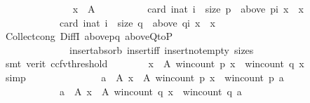 \begin{isabellebody}
\ \ \ \ \ \ \isamarkupfalse%
\isanewline
\ \ \ \ \ \ \ \ {\isachardoublequoteopen}{\isasymforall}x\ {\isasymin}\ A{\isachardot}{\kern0pt}\isanewline
\ \ \ \ \ \ \ \ \ \ card\ {\isacharbraceleft}{\kern0pt}i{\isacharcolon}{\kern0pt}{\isacharcolon}{\kern0pt}nat{\isachardot}{\kern0pt}\ i\ {\isacharless}{\kern0pt}\ size\ p\ {\isasymand}\ above\ {\isacharparenleft}{\kern0pt}p{\isacharbang}{\kern0pt}i{\isacharparenright}{\kern0pt}\ x\ {\isacharequal}{\kern0pt}\ {\isacharbraceleft}{\kern0pt}x{\isacharbraceright}{\kern0pt}{\isacharbraceright}{\kern0pt}\ {\isacharequal}{\kern0pt}\isanewline
\ \ \ \ \ \ \ \ \ \ \ \ card\ {\isacharbraceleft}{\kern0pt}i{\isacharcolon}{\kern0pt}{\isacharcolon}{\kern0pt}nat{\isachardot}{\kern0pt}\ i\ {\isacharless}{\kern0pt}\ size\ q\ {\isasymand}\ above\ {\isacharparenleft}{\kern0pt}q{\isacharbang}{\kern0pt}i{\isacharparenright}{\kern0pt}\ x\ {\isacharequal}{\kern0pt}\ {\isacharbraceleft}{\kern0pt}x{\isacharbraceright}{\kern0pt}{\isacharbraceright}{\kern0pt}{\isachardoublequoteclose}\isanewline
\ \ \ \ \ \ \ \ \isamarkupfalse%
\ Collect{\isacharunderscore}{\kern0pt}cong\ DiffI\ above{\isacharunderscore}{\kern0pt}pq\ above{\isacharunderscore}{\kern0pt}QtoP\isanewline
\ \ \ \ \ \ \ \ \ \ \ \ \ \ insert{\isacharunderscore}{\kern0pt}absorb\ insert{\isacharunderscore}{\kern0pt}iff\ insert{\isacharunderscore}{\kern0pt}not{\isacharunderscore}{\kern0pt}empty\ sizes\isanewline
\ \ \ \ \ \ \ \ \isamarkupfalse%
\ {\isacharparenleft}{\kern0pt}smt\ {\isacharparenleft}{\kern0pt}verit{\isacharcomma}{\kern0pt}\ ccfv{\isacharunderscore}{\kern0pt}threshold{\isacharparenright}{\kern0pt}{\isacharparenright}{\kern0pt}\isanewline
\ \ \ \ \ \ \isamarkupfalse%
\ {\isachardoublequoteopen}{\isasymforall}x\ {\isasymin}\ A{\isachardot}{\kern0pt}\ win{\isacharunderscore}{\kern0pt}count\ p\ x\ {\isacharequal}{\kern0pt}\ win{\isacharunderscore}{\kern0pt}count\ q\ x{\isachardoublequoteclose}\isanewline
\ \ \ \ \ \ \ \ \isamarkupfalse%
\ simp\isanewline
\ \ \ \ \ \ \isamarkupfalse%
\isanewline
\ \ \ \ \ \ \ \ {\isachardoublequoteopen}{\isacharbraceleft}{\kern0pt}a\ {\isasymin}\ A{\isachardot}{\kern0pt}\ {\isasymforall}x\ {\isasymin}\ A{\isachardot}{\kern0pt}\ win{\isacharunderscore}{\kern0pt}count\ p\ x\ {\isasymle}\ win{\isacharunderscore}{\kern0pt}count\ p\ a{\isacharbraceright}{\kern0pt}\ {\isacharequal}{\kern0pt}\isanewline
\ \ \ \ \ \ \ \ \ \ \ \ {\isacharbraceleft}{\kern0pt}a\ {\isasymin}\ A{\isachardot}{\kern0pt}\ {\isasymforall}x\ {\isasymin}\ A{\isachardot}{\kern0pt}\ win{\isacharunderscore}{\kern0pt}count\ q\ x\ {\isasymle}\ win{\isacharunderscore}{\kern0pt}count\ q\ a{\isacharbraceright}{\kern0pt}{\isachardoublequoteclose}\isanewline

\end{isabellebody}
